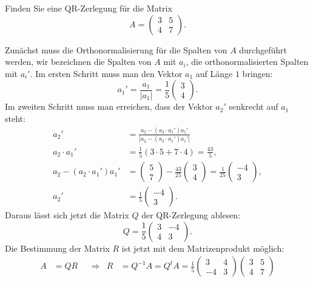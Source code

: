 Finden Sie eine QR-Zerlegung für die Matrix
\[
A=\begin{pmatrix}
3&5\\
4&7
\end{pmatrix}.
\]


\begin{loesung}
Zunächst muss die Orthonormalisierung für die Spalten von $A$
durchgeführt werden, wir bezeichnen die Spalten von $A$ mit $a_i$,
die orthonormalisierten Spalten mit $a_i'$. Im ersten Schritt muss man
den Vektor $a_1$ auf Länge $1$ bringen:
\[
a_1'=\frac{a_1}{|a_1|}=\frac15\begin{pmatrix}3\\4\end{pmatrix}.
\]
Im zweiten Schritt muss man erreichen, dass der Vektor $a_2'$ senkrecht
auf $a_1$ steht:
\begin{align*}
a_2'&=\frac{a_2-(a_2\cdot a_1')a_1'}{|a_2-(a_2\cdot a_1')a_1'|}\\
a_2\cdot a_1'&=\frac15(3\cdot 5+7\cdot 4)=\frac{43}{5},\\
a_2-(a_2\cdot a_1')a_1'&=
\begin{pmatrix}5\\7\end{pmatrix}
-\frac{43}{25}\begin{pmatrix}3\\4\end{pmatrix}
=\frac{1}{25}\begin{pmatrix}-4\\3\end{pmatrix},
\\
a_2'&=\frac15\begin{pmatrix}-4\\3\end{pmatrix}.
\end{align*}
Daraus lässt sich jetzt die Matrix $Q$ der QR-Zerlegung ablesen:
\[
Q=\frac15
\begin{pmatrix}
3&-4\\
4& 3
\end{pmatrix}.
\]
Die Bestimmung der Matrix $R$ ist jetzt mit dem Matrizenprodukt möglich:
\begin{align*}
A&=QR&&\Rightarrow&R&=Q^{-1}A=Q^tA=\frac15\begin{pmatrix}3&4\\-4&3\end{pmatrix}
\begin{pmatrix}3&5\\4&7\end{pmatrix}

\end{align*}
\end{loesung}
